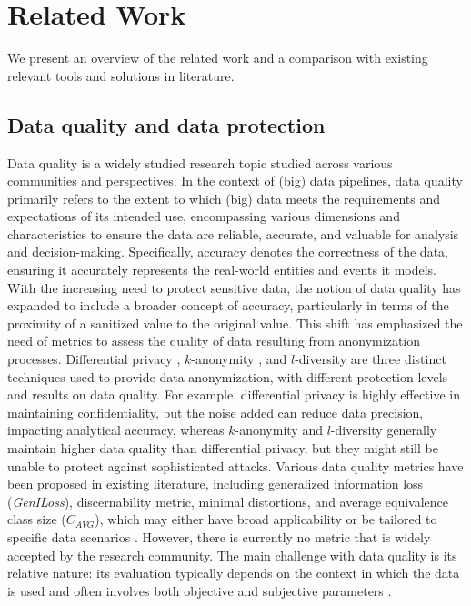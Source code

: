 \section{Related Work}\label{sec:related}

{\color{OurColor}
We present an overview of the related work and a comparison with existing relevant tools and solutions in literature.

\subsection{Data quality and data protection}\label{sec:dataquality}

Data quality is a widely studied research topic studied across various communities and perspectives. In the context of (big) data pipelines, data quality primarily refers to the extent to which (big) data meets the requirements and expectations of its intended use, encompassing various dimensions and characteristics to ensure the data are reliable, accurate, and valuable for analysis and decision-making. Specifically, accuracy denotes the correctness of the data, ensuring it accurately represents the real-world entities and events it models.
    {\color{OurColor}
        With the increasing need to protect sensitive data, the notion of data quality has expanded to include a broader concept of accuracy, particularly in terms of the proximity of a sanitized value to the original value.
        This shift has emphasized the need of metrics to assess the quality of data resulting from anonymization processes.
        Differential privacy \cite{dwork2008differential}, $k$-anonymity \cite{k-anon}, and $l$-diversity \cite{l-diversity} are three distinct techniques used to provide data anonymization, with different protection levels and results on data quality. For example, differential privacy is highly effective in maintaining confidentiality, but the noise added can reduce data precision, impacting analytical accuracy, whereas $k$-anonymity and $l$-diversity generally maintain higher data quality than differential privacy, but they might still be unable to protect against sophisticated attacks.
    }
Various data quality metrics have been proposed in existing literature, including generalized information loss (\textit{GenILoss}), discernability metric, minimal distortions, and average equivalence class size ($C_{AVG}$), which may either have broad applicability or be tailored to specific data scenarios \cite{Majeed2021AnonymizationTF,bookMetrics,reviewMetrics}. However, there is currently no metric that is widely accepted by the research community. The main challenge with data quality is its relative nature: its evaluation typically depends on the context in which the data is used and often involves both objective and subjective parameters \cite{dataAccuracy,dataQuality}.
}

